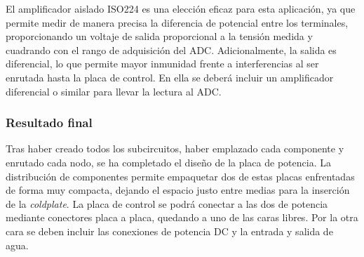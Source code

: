 El amplificador aislado ISO224 es una elección eficaz para esta aplicación, ya que permite medir de manera precisa la diferencia de potencial entre los terminales, proporcionando un voltaje de salida proporcional a la tensión medida y cuadrando con el rango de adquisición del ADC. Adicionalmente, la salida es diferencial, lo que permite mayor inmunidad frente a interferencias al ser enrutada hasta la placa de control. En ella se deberá incluir un amplificador diferencial o similar para llevar la lectura al ADC.

\subsubsection{Resultado final}

Tras haber creado todos los subcircuitos, haber emplazado cada componente y enrutado cada nodo, se ha completado el diseño de la placa de potencia. La distribución de componentes permite empaquetar dos de estas placas enfrentadas de forma muy compacta, dejando el espacio justo entre medias para la inserción de la \textit{coldplate}. La placa de control se podrá conectar a las dos de potencia mediante conectores placa a placa, quedando a uno de las caras libres. Por la otra cara se deben incluir las conexiones de potencia DC y la entrada y salida de agua.

